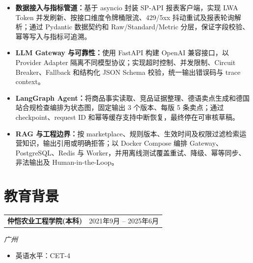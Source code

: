 \documentclass[10pt, a4paper]{article}
\begin{document}
\begin{itemize}
  \item {\fontsize{9}{12}\selectfont\textbf{数据接入与指标管道：}基于 asyncio 封装 SP-API 报表客户端，实现 LWA Token 并发刷新、按接口维度令牌桶限流、429/5xx 抖动重试及报表轮询解析；通过 Pydantic 数据契约和 Raw/Standard/Metric 分层，保证字段校验、幂等写入与指标可追溯。}

  \item {\fontsize{9}{12}\selectfont\textbf{LLM Gateway 与可靠性：}使用 FastAPI 构建 OpenAI 兼容接口，以 Provider Adapter 隔离不同模型协议；实现超时控制、并发限制、Circuit Breaker、Fallback 和结构化 JSON Schema 校验，统一输出错误码与 trace context。}

  \item {\fontsize{9}{12}\selectfont\textbf{LangGraph Agent：}将商品事实读取、竞品证据整理、德语卖点生成和德国站合规检查编排为状态图，固定输出 3 个版本、每版 5 条卖点；通过 checkpoint、request ID 和幂等缓存支持中断恢复，最终停在可审核草稿。}

  \item {\fontsize{9}{12}\selectfont\textbf{RAG 与工程边界：}按 marketplace、规则版本、生效时间及权限过滤检索运营知识，输出引用或明确拒答；以 Docker Compose 编排 Gateway、PostgreSQL、Redis 与 Worker，并用离线测试覆盖重试、降级、幂等同步、非法输出及 Human-in-the-Loop。}
\end{itemize}

\vspace{1pt}


\section{教育背景}

\noindent
\begin{tabularx}{\textwidth}{@{}X r@{}}
{\fontsize{10}{12}\selectfont\textbf{仲恺农业工程学院(本科)}} &
{\fontsize{10}{12}\selectfont 2021年9月 -- 2025年6月}
\end{tabularx}

 \hfill {\fontsize{10}{12}\selectfont\textit{广州}}

\vspace{1pt}
\begin{itemize}
  \item {\fontsize{9}{12}\selectfont 英语水平：CET-4}
\end{itemize}
\end{document}
